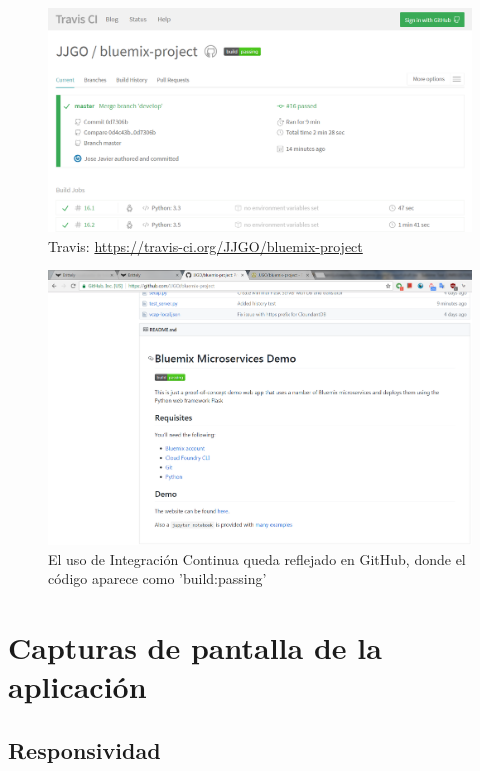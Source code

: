 \documentclass[a4paper]{article}
\begin{document}
\begin{figure}[htp!]
    \centering
    \caption{Travis: \url{https://travis-ci.org/JJGO/bluemix-project}}
    \label{fig:travis}
    \includegraphics[width=\textwidth]{travis}
\end{figure}

\begin{figure}[htp!]
    \centering
    \caption{El uso de Integración Continua queda reflejado en GitHub, donde el código aparece como 'build:passing'}
    \label{fig:git2}
    \includegraphics[width=\textwidth]{git2}
\end{figure}


\newpage
\clearpage
\section{Capturas de pantalla de la aplicación} %
\label{sec:capturas_de_pantalla_de_la_aplicación}
\subsection{Responsividad} %
\label{sub:responsividad}
\end{document}
